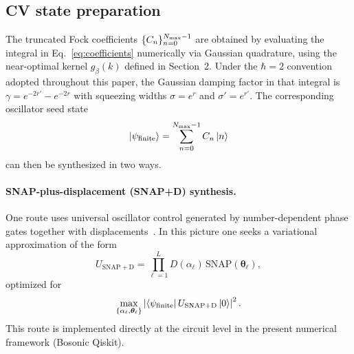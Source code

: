 \documentclass{article}
\begin{document}
\subsection{CV state preparation}
\label{ss:cv-prep}

The truncated Fock coefficients $\{C_n\}_{n=0}^{N_{\rm max}-1}$ are obtained by evaluating the integral in Eq.~\eqref{eq:coefficients} numerically via Gaussian quadrature, using the near-optimal kernel $g_\beta(k)$ defined in Section~2. Under the $\hbar=2$ convention adopted throughout this paper, the Gaussian damping factor in that integral is $\gamma=e^{-2r'}-e^{-2r}$ with squeezing widths $\sigma=e^r$ and $\sigma'=e^{r'}$.
The corresponding oscillator seed state
\[
\ket{\psi_{\mathrm{finite}}}=\sum_{n=0}^{N_{\rm max}-1}C_n\ket{n}
\]
can then be synthesized in two ways.

\paragraph{SNAP-plus-displacement (SNAP+D) synthesis.}
One route uses universal oscillator control generated by number-dependent phase gates together with displacements~\cite{heeres2015cavity, Krastanov2015}. In this picture one seeks a variational approximation of the form
\begin{equation}
U_{\mathrm{SNAP+D}}=\prod_{\ell=1}^{L}D(\alpha_\ell)\,\mathrm{SNAP}(\bm{\theta}_\ell),
\end{equation}
optimized for
\begin{equation}
\max_{\{\alpha_\ell,\bm{\theta}_\ell\}}
\left|\bra{\psi_{\mathrm{finite}}}
U_{\mathrm{SNAP+D}}\ket{0}\right|^2.
\end{equation}
This route is implemented directly at the circuit level in the present numerical framework (Bosonic Qiskit).
\end{document}
